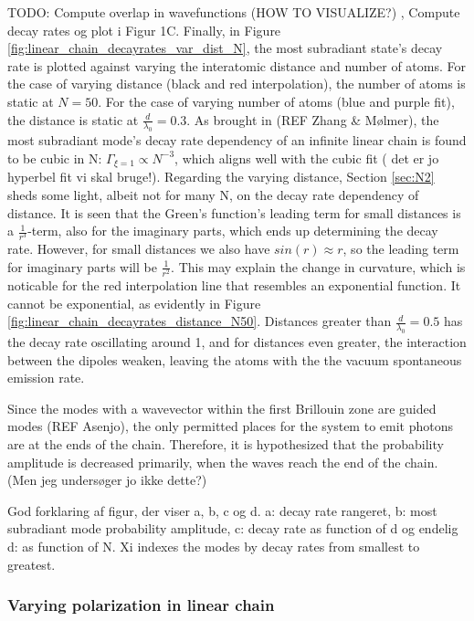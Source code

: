 \documentclass{article}
\begin{document}
TODO: Compute overlap in wavefunctions (HOW TO VISUALIZE?) , Compute decay rates og plot i Figur 1C. Finally, in Figure \ref{fig:linear_chain_decayrates_var_dist_N}, the most subradiant state's decay rate is plotted against varying the interatomic distance and number of atoms. For the case of varying distance (black and red interpolation), the number of atoms is static at $N=50$. For the case of varying number of atoms (blue and purple fit), the distance is static at $\frac{d}{\lambda_0} = 0.3$. As brought in (REF Zhang \& Mølmer), the most subradiant mode's decay rate dependency of an infinite linear chain is found to be cubic in N: $\Gamma_{\xi=1} \propto N^{-3}$, which aligns well with the cubic fit ( det er jo hyperbel fit vi skal bruge!). Regarding the varying distance, Section \ref{sec:N2} sheds some light, albeit not for many N, on the decay rate dependency of distance. It is seen that the Green's function's leading term for small distances is a $\frac{1}{r^3}$-term, also for the imaginary parts, which ends up determining the decay rate. However, for small distances we also have $sin(r) \approx r$, so the leading term for imaginary parts will be $\frac{1}{r^2}$. This may explain the change in curvature, which is noticable for the red interpolation line that resembles an exponential function. It cannot be exponential, as evidently in Figure \ref{fig:linear_chain_decayrates_distance_N50}. Distances greater than $\frac{d}{\lambda_0} = 0.5$ has the decay rate oscillating around 1, and for distances even greater, the interaction between the dipoles weaken, leaving the atoms with the the vacuum spontaneous emission rate. 

Since the modes with a wavevector within the first Brillouin zone are guided modes (REF Asenjo), the only permitted places for the system to emit photons are at the ends of the chain. Therefore, it is hypothesized that the probability amplitude is decreased primarily, when the waves reach the end of the chain. (Men jeg undersøger jo ikke dette?)

God forklaring af figur, der viser a, b, c og d. a: decay rate rangeret, b: most subradiant mode probability amplitude, c: decay rate as function of d og endelig d: as function of N. Xi indexes the modes by decay rates from smallest to greatest. 

\subsubsection{Varying polarization in linear chain}\label{disc:linear_chain_varypola}
\end{document}
